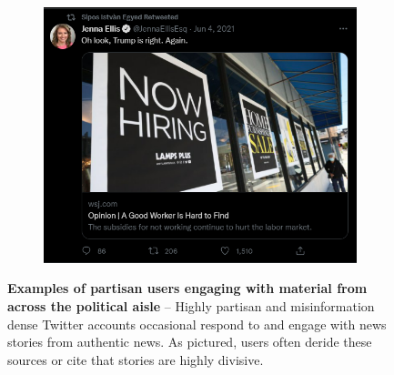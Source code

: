 \begin{figure}
\begin{subfigure}{.3\textwidth}
  \centering
  \includegraphics[width=1\linewidth]{figures/high-var-user-tweet3.png}
  \label{fig:twitter-misinformation3}
\end{subfigure}
\caption{\textbf{Examples of partisan users engaging with material from across the political aisle }-- Highly partisan and misinformation dense Twitter accounts occasional respond to and engage with news stories from authentic news. As pictured, users often deride these sources or cite that stories are  highly divisive.
}
\label{fig:twitter-misinformation-levels}
\end{figure}


